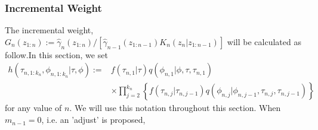 \documentclass[12pt,a4paper]{article}
\begin{document}
\subsubsection{Incremental Weight}
The incremental weight, $G_n\left(z_{1:n}\right):= \hat{\gamma}_n\left(z_{1:n}\right) / \left[\hat{\gamma}_{n-1}\left(z_{1:n-1}\right)K_n\left(z_{n}|z_{1:n-1}\right)\right]$ will be calculated as follow.In this section, we set     
\begin{equation*}
        \begin{split}
            h\left(\tau_{n,1:k_n},\phi_{n,1:k_n}|\tau,\phi \right) := &f\left(\tau_{n,1}| \tau\right) q\left(\phi_{n,1}|\phi,\tau,\tau_{n,1}\right)\\
             & \times \prod_{j=2}^{k_n} \left\{f(\tau_{n,j}|\tau_{n,j-1})q(\phi_{n,j}|\phi_{n,j-1},\tau_{n,j},\tau_{n,j-1})\right\}
        \end{split}
\end{equation*}
for any value of $n$. We will use this notation throughout this section. 
When $m_{n-1} = 0$, i.e. an 'adjust' is proposed,
\end{document}
